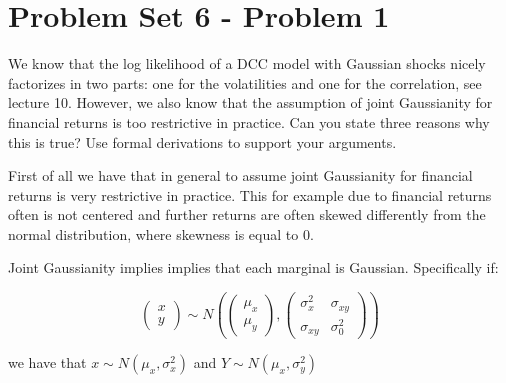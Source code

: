 \documentclass{article}
\begin{document}
\section{Problem Set 6 - Problem 1}

\begin{tcolorbox}[colback=white]
We know that the log likelihood of a DCC model with Gaussian shocks nicely factorizes in two parts: one for the volatilities and one for the correlation, see lecture 10. However, we also know that the assumption of joint Gaussianity for financial returns is too restrictive in practice. Can you state three reasons why this is true? Use formal derivations to support your arguments.
\end{tcolorbox}

First of all we have that in general to assume joint Gaussianity for financial returns is very restrictive in practice. This for example due to financial returns often is not centered and further returns are often skewed differently from the normal distribution, where skewness is equal to $0$. 

\bigskip

Joint Gaussianity implies implies that each marginal is Gaussian. Specifically if:

$$
\left(\begin{array}{l}
x \\
y
\end{array}\right) \sim N\left(\left(\begin{array}{l}
\mu_{x} \\
\mu_{y}
\end{array}\right),\left(\begin{array}{ll}
\sigma_{x}^{2} & \sigma_{x y} \\
\sigma_{x y} & \sigma_{0}^{2}
\end{array}\right)\right)
$$

we have that $x \sim N\left(\mu_{x}, \sigma_{x}^{2}\right)$ and $Y \sim N\left(\mu_{x}, \sigma_{y}^{2}\right)$ 
\end{document}
